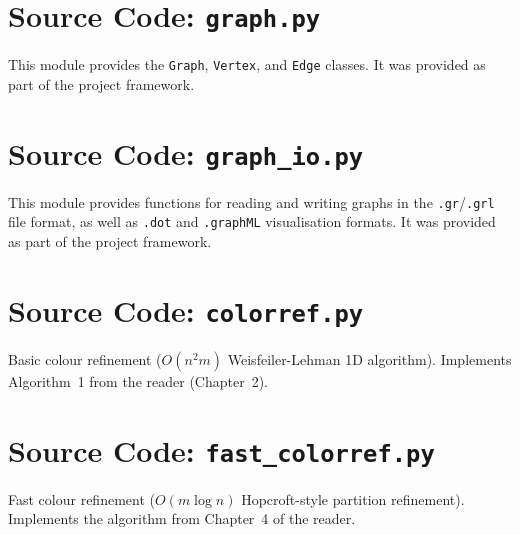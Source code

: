 \documentclass[twoside]{article}
\begin{document}
\appendix


\section{Source Code: \texttt{graph.py}}\label{app:graph}

This module provides the \texttt{Graph}, \texttt{Vertex}, and \texttt{Edge} classes. It was provided as part of the project framework.



\section{Source Code: \texttt{graph\_io.py}}\label{app:graph_io}

This module provides functions for reading and writing graphs in the \texttt{.gr}/\texttt{.grl} file format, as well as \texttt{.dot} and \texttt{.graphML} visualisation formats. It was provided as part of the project framework.



\section{Source Code: \texttt{colorref.py}}\label{app:colorref}

Basic colour refinement ($O(n^2 m)$ Weisfeiler-Lehman 1D algorithm). Implements Algorithm~1 from the reader (Chapter~2).



\section{Source Code: \texttt{fast\_colorref.py}}\label{app:fast_colorref}

Fast colour refinement ($O(m \log n)$ Hopcroft-style partition refinement). Implements the algorithm from Chapter~4 of the reader.


\end{document}
